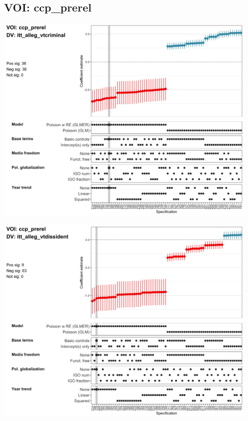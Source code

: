 \documentclass[]{article}
\begin{document}
\hypertarget{voi-ccp_prerel}{%
\subsection{VOI: ccp\_prerel}\label{voi-ccp_prerel}}

\includegraphics[height=4in]{../output/figures-robustness/specplot-ccp_prerel-itt_alleg_vtcriminal.png}

\includegraphics[height=4in]{../output/figures-robustness/specplot-ccp_prerel-itt_alleg_vtdissident.png}
\end{document}
